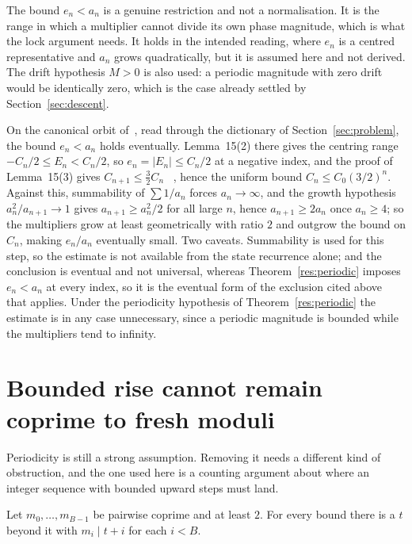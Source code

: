 \documentclass[11pt]{article}
\begin{document}
The bound $e_n<a_n$ is a genuine restriction and not a normalisation.  It is
the range in which a multiplier cannot divide its own phase magnitude, which
is what the lock argument needs.  It holds in the intended reading, where
$e_n$ is a centred representative and $a_n$ grows quadratically, but it is
assumed here and not derived.  The drift hypothesis $M>0$ is also used: a
periodic magnitude with zero drift would be identically zero, which is the case
already settled by Section~\ref{sec:descent}.

\begin{remark}
On the canonical orbit of~\cite{koizumi2025}, read through the dictionary of
Section~\ref{sec:problem}, the bound $e_n<a_n$ holds eventually.  Lemma~15(2)
there gives the centring range $-C_n/2\le E_n<C_n/2$, so $e_n=|E_n|\le C_n/2$ at
a negative index, and the proof of Lemma~15(3) gives $C_{n+1}\le\tfrac32C_n$
~\cite[p.~9]{koizumi2025},
hence the uniform bound $C_n\le C_0(3/2)^{n}$.  Against this, summability of
$\sum1/a_n$ forces
$a_n\to\infty$, and the growth hypothesis $a_n^{2}/a_{n+1}\to1$ gives
$a_{n+1}\ge a_n^{2}/2$ for all large $n$, hence $a_{n+1}\ge2a_n$ once
$a_n\ge4$; so the multipliers grow at least geometrically with ratio $2$ and
outgrow the bound on $C_n$, making $e_n/a_n$ eventually small.  Two caveats.
Summability is used for this step, so the estimate is not available from the
state recurrence alone; and the conclusion is eventual and not universal,
whereas Theorem~\ref{res:periodic} imposes $e_n<a_n$ at every index, so it is
the eventual form of the exclusion cited above that applies.  Under the
periodicity hypothesis of Theorem~\ref{res:periodic} the estimate is in any
case unnecessary, since a periodic magnitude is bounded while the multipliers
tend to infinity.
\end{remark}

\section{Bounded rise cannot remain coprime to fresh moduli}\label{sec:barrier}

Periodicity is still a strong assumption.  Removing it needs a different kind
of obstruction, and the one used here is a counting argument about where an
integer sequence with bounded upward steps must land.

\begin{lemma}\label{res:crt}
Let $m_0,\ldots,m_{B-1}$ be pairwise coprime and at least $2$.  For every bound
there is a $t$ beyond it with $m_i\mid t+i$ for each $i<B$.
\end{lemma}
\end{document}
